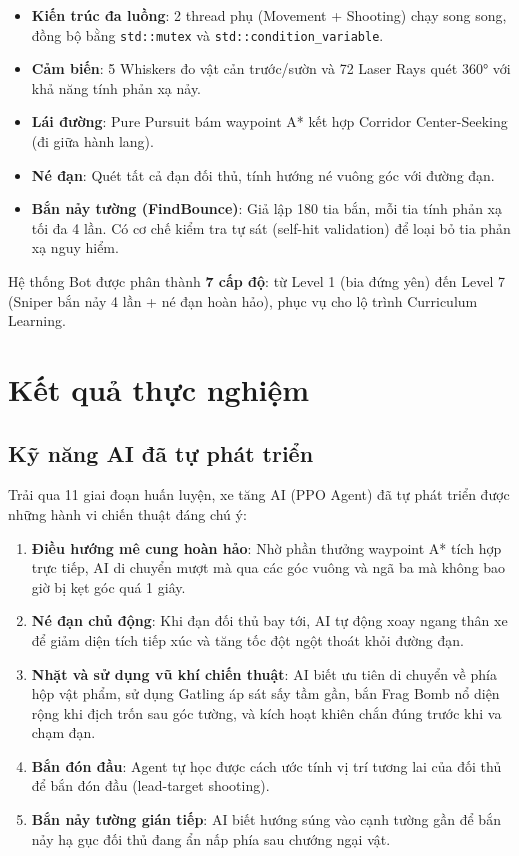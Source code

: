\documentclass[a4paper, 12pt]{report}
\begin{document}
  \begin{itemize}
    \item \textbf{Kiến trúc đa luồng}: 2 thread phụ (Movement + Shooting) chạy song song, đồng bộ bằng \texttt{std::mutex} và \texttt{std::condition\_variable}.
    \item \textbf{Cảm biến}: 5 Whiskers đo vật cản trước/sườn và 72 Laser Rays quét 360° với khả năng tính phản xạ nảy.
    \item \textbf{Lái đường}: Pure Pursuit bám waypoint A* kết hợp Corridor Center-Seeking (đi giữa hành lang).
    \item \textbf{Né đạn}: Quét tất cả đạn đối thủ, tính hướng né vuông góc với đường đạn.
    \item \textbf{Bắn nảy tường (FindBounce)}: Giả lập 180 tia bắn, mỗi tia tính phản xạ tối đa 4 lần. Có cơ chế kiểm tra tự sát (self-hit validation) để loại bỏ tia phản xạ nguy hiểm.
  \end{itemize}

  Hệ thống Bot được phân thành \textbf{7 cấp độ}: từ Level 1 (bia đứng yên) đến Level 7 (Sniper bắn nảy 4 lần + né đạn hoàn hảo), phục vụ cho lộ trình Curriculum Learning.

  \chapter{Kết quả thực nghiệm}

  \section{Kỹ năng AI đã tự phát triển}

  Trải qua 11 giai đoạn huấn luyện, xe tăng AI (PPO Agent) đã tự phát triển được những hành vi chiến thuật đáng chú ý:

  \begin{enumerate}
    \item \textbf{Điều hướng mê cung hoàn hảo}: Nhờ phần thưởng waypoint A* tích hợp trực tiếp, AI di chuyển mượt mà qua các góc vuông và ngã ba mà không bao giờ bị kẹt góc quá 1 giây.
    \item \textbf{Né đạn chủ động}: Khi đạn đối thủ bay tới, AI tự động xoay ngang thân xe để giảm diện tích tiếp xúc và tăng tốc đột ngột thoát khỏi đường đạn.
    \item \textbf{Nhặt và sử dụng vũ khí chiến thuật}: AI biết ưu tiên di chuyển về phía hộp vật phẩm, sử dụng Gatling áp sát sấy tầm gần, bắn Frag Bomb nổ diện rộng khi địch trốn sau góc tường, và kích hoạt khiên chắn đúng trước khi va chạm đạn.
    \item \textbf{Bắn đón đầu}: Agent tự học được cách ước tính vị trí tương lai của đối thủ để bắn đón đầu (lead-target shooting).
    \item \textbf{Bắn nảy tường gián tiếp}: AI biết hướng súng vào cạnh tường gần để bắn nảy hạ gục đối thủ đang ẩn nấp phía sau chướng ngại vật.
  \end{enumerate}
\end{document}
